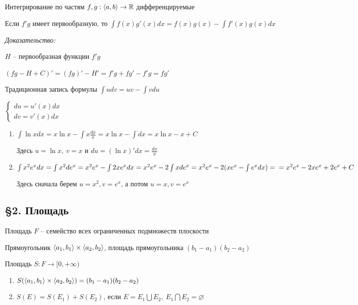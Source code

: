 \documentclass[12pt]{article}
\begin{document}
\begin{theo}{Интегрирование по частям}
    $f, g : \langle a, b \rangle \rightarrow \mathbb R$ дифференцируемые

    Если $f'g$ имеет первообразную, то $\int f(x)g'(x)dx = f(x)g(x) - \int f'(x)g(x)dx$
\end{theo}

\textit{Доказательство:}

$H$ -- первообразная функции $f'g$

$(fg - H + C)' = (fg)' - H' = f'g + fg' - f'g = fg'$

\begin{nota}{Традиционная запись формулы}
    $\int udv = uv - \int vdu$

    $\begin{cases}
        du = u'(x)dx \\
        dv = v'(x)dx
    \end{cases}$
\end{nota}

\begin{Example}{}
    \begin{enumerate}
        \item $\int \ln{x}dx = x\ln{x} - \int x \frac{dx}{x} = x\ln{x} - \int dx = x\ln{x} - x + C$
        
        Здесь $u = \ln{x},\ v = x$ и $du = (\ln{x})'dx = \frac{dx}{x}$ 

        \item $\int x^2 e^x dx = \int x^2 de^x = x^2 e^x - \int 2x e^x dx = x^2 e^x - 2\int xde^x = x^2e^x - 2(xe^x - \int e^xdx) = \\ = x^2e^x - 2xe^x + 2e^x + C$
        
        Здесь сначала берем $u = x^2, v = e^x$, а потом $u = x, v = e^x$
    \end{enumerate}
\end{Example}

\subsection{\S 2. Площадь}

\begin{defin}{Площадь}
    $F$ -- семейство всех ограниченных подмножеств плоскости

    Прямоугольник $\langle a_1, b_1 \rangle \times \langle a_2, b_2 \rangle$, площадь прямоугольника $(b_1 - a_1)(b_2 - a_2)$

    Площадь $S : F \rightarrow [0, + \infty)$

    \begin{enumerate}
        \item $S(\langle a_1, b_1 \rangle \times \langle a_2, b_2 \rangle) = (b_1 - a_1)(b_2 - a_2)$
        \item $S(E) = S(E_1) + S(E_2)$, если $E = E_1 \bigcup E_2,\ E_1 \bigcap E_2 = \varnothing$
    \end{enumerate}
\end{defin}
\end{document}
